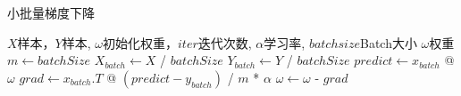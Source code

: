 \documentclass[11pt]{article}
\begin{document}
\begin{CJK*}{UTF8}{gkai}
    \begin{algorithm}
        \caption{小批量梯度下降}
        \begin{algorithmic}[1] %
            \Require $X$样本，$Y$样本, $\omega$初始化权重，$iter$迭代次数, $\alpha$学习率, $batchsize$Batch大小
            \Ensure $\omega$权重
            	\State $m \gets batchSize$
				\State $X_{batch} \gets X$ / $batchSize$
				\State $Y_{batch} \gets Y$ / $batchSize$
                	\State $predict \gets x_{batch}$ @ $\omega$
					\State $grad \gets x_{batch}.T$ @ $(predict-y_{batch})$ / $m$ * $\alpha$
					\State $\omega \gets \omega$ - $grad$
                \EndFor
                \State \Return{$\omega$}
            \EndFunction
        \end{algorithmic}
    \end{algorithm}
\end{CJK*}
\end{document}
